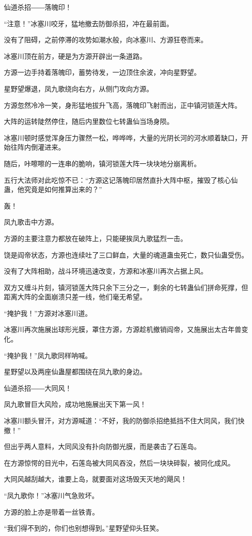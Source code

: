 \begin{this_body}
仙道杀招――落魄印！

“注意！”冰塞川咬牙，猛地撤去防御杀招，冲在最前面。

没有了阻碍，之前停滞的攻势如潮水般，向冰塞川、方源狂卷而来。

冰塞川顶在前方，硬是为方源开辟出一条道路。

方源一边手持着落魄印，蓄势待发，一边顶住余波，冲向星野望。

星野望爆退，凤九歌绕向右方，从侧门攻向方源。

方源忽然冷冷一笑，身形猛地拔升飞高，落魄印飞射而出，正中镇河锁莲大阵。

大阵的运转陡然停住，随后内里数位七转蛊仙当场身陨。

冰塞川顿时感觉浑身压力骤然一松，哗哗哗，大量的光阴长河的河水顺着缺口，开始往阵内倒灌进来。

随后，咔嚓嚓的一连串的脆响，镇河锁莲大阵一块块地分崩离析。

五行大法师对此吃惊不已：“方源这记落魄印居然直扑大阵中枢，摧毁了核心仙蛊，他究竟是如何推算出来的？”

轰！

凤九歌击中方源。

方源的主要注意力都放在破阵上，只能硬挨凤九歌猛烈一击。

饶是阎帝状态，方源也连续吐了三口鲜血，大量的魂道蛊虫死亡，数只仙蛊受伤。

没有了大阵相助，战斗环境迅速改变，方源和冰塞川再次占据上风。

双方又缠斗片刻，镇河锁莲大阵只余下三分之一，剩余的七转蛊仙们拼命死撑，但距离大阵的全面崩溃只差一线，他们毫无希望。

“掩护我！”方源对冰塞川道。

冰塞川再次施展出球形光膜，罩住方源，方源趁机撤销阎帝，又施展出太古年兽变化。

“掩护我！”凤九歌同样呐喊。

星野望以及两座仙蛊屋都围绕在凤九歌的身边。

仙道杀招――大同风！

凤九歌冒巨大风险，成功地施展出天下第一风！

冰塞川额头冒汗，对方源喊道：“不好，我的防御杀招绝抵挡不住大同风，我们快撤！”

但出乎两人意料，大同风没有扑向防御光膜，而是袭击了石莲岛。

在方源惊愕的目光中，石莲岛被大同风吞没，然后一块块碎裂，被同化成风。

大同风越刮越大，谁要上岛，就要面对这场毁天灭地的飓风！

“凤九歌你！”冰塞川气急败坏。

方源的脸上亦是带着一丝铁青。

“我们得不到的，你们也别想得到。”星野望仰头狂笑。

\end{this_body}

